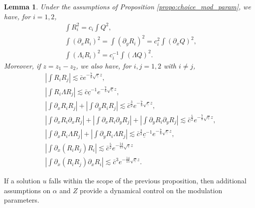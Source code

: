 \documentclass[reqno,10pt]{amsart}
\newtheorem{lemm}{Lemma}[section]
\numberwithin{equation}{section}
\begin{document}
	\begin{lemm} \label{est:R1R2}
		Under the assumptions of Proposition \ref{propo:choice_mod_param}, we have, for $i=1,2$, 
		\begin{align} 
			& \int R_i^2=c_i \int Q^2, \label{id:Ri}\\  
			& \int (\partial_x R_i)^2=\int (\partial_y R_i)^2=c_i^2 \int (\partial_xQ)^2,\label{id:dRi} \\
			&\int (\Lambda_i R_i)^2=c_i^{-1} \int (\Lambda Q)^2.\label{Lambda:dRi}
		\end{align}
		Moreover, if $z=z_1-z_2$, we also have, for $i,j=1,2$ with $i \neq j$,
		\begin{align} 
			& \left| \int R_i R_j \right| \lesssim  \bar{c}e^{-\frac78  \sqrt{\underline{c}} z}, \label{est:R1R2.1}\\
			& \left| \int R_i \Lambda R_j \right| \lesssim  \bar{c}\underline{c}^{-1}e^{-\frac78 \sqrt{\underline{c}} z} , \label{est:R1R2.2}\\  
			& \left| \int \partial_xR_i R_j \right|+\left| \int \partial_yR_i R_j \right| \lesssim  \bar{c}^{\frac32}e^{-\frac78 \sqrt{\underline{c}} z},
			\label{est:R1R2.3} \\ 
			& \left| \int \partial_xR_i \partial_xR_j \right|+\left| \int \partial_xR_i \partial_yR_j \right|+\left| \int \partial_yR_i \partial_yR_j \right| \lesssim  \bar{c}^{\frac52}e^{-\frac78 \sqrt{\underline{c}} z},
			\label{est:R1R2.4} \\ 
			&\left| \int \partial_xR_i \Lambda R_j \right|+\left| \int \partial_yR_i \Lambda R_j \right| 
			\lesssim \bar{c}^{\frac32}\underline{c}^{-1}e^{-\frac78 \sqrt{\underline{c}} z}, \label{est:R1R2.5} \\ 
			&\left| \int \partial_x(R_iR_j) R_i \right|  
			\lesssim \bar{c}^{\frac52}e^{-\frac{14}{15}\sqrt{\underline{c}} z} \label{est:R1R2.6}\\ 
			&\left| \int \partial_x(R_iR_j) \partial_xR_i \right|  
			\lesssim \bar{c}^{3}e^{-\frac{14}{15}\sqrt{\underline{c}} z} . \label{est:R1R2.7}
		\end{align}
	\end{lemm}
	
	
	
	If a solution $u$ falls within the scope of the previous proposition, then additional assumptions on $\alpha$ and $Z$ provide a dynamical control on the modulation parameters.
	
\end{document}
